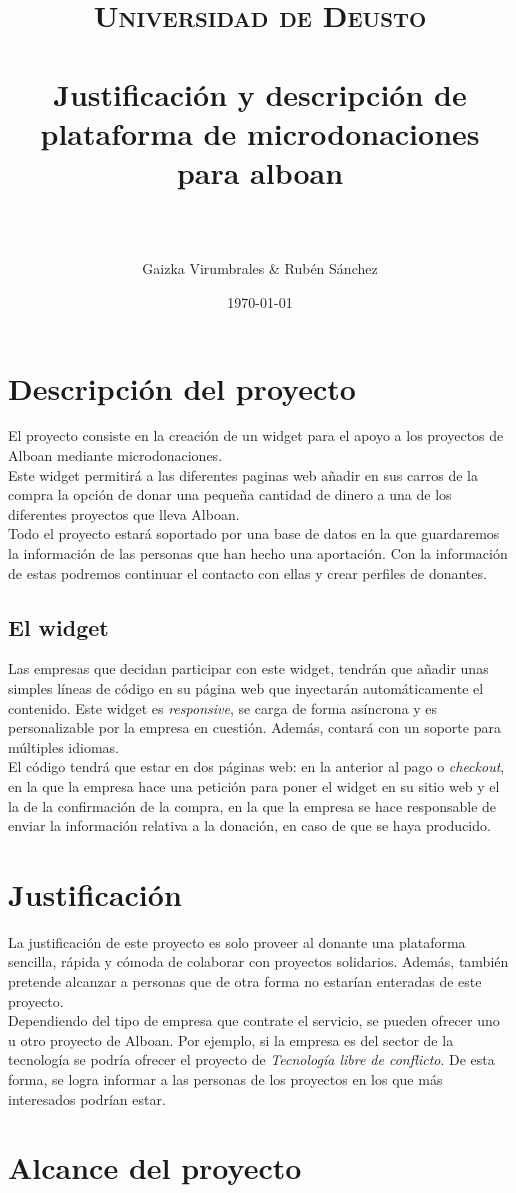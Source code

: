 \documentclass[paper=a4, fontsize=12pt]{scrartcl} %
\title{	
\normalfont \normalsize 
\textsc{Universidad de Deusto} \\ [25pt] %
\horrule{0.5pt} \\[0.4cm] %
\huge Justificación y descripción de plataforma de microdonaciones para alboan\\ %
\horrule{2pt} \\[0.5cm] %
\author{Gaizka Virumbrales \& Rubén Sánchez} %
}
\date{\normalsize\today} %
\numberwithin{equation}{section} %
\numberwithin{figure}{section} %
\numberwithin{table}{section} %
\begin{document}
\maketitle %


\section{Descripción del proyecto}

El proyecto consiste en la creación de un widget para el apoyo a los proyectos de Alboan mediante microdonaciones.\\
Este widget permitirá a las diferentes paginas web añadir en sus carros de la compra la opción de donar una pequeña cantidad de dinero a una de los diferentes proyectos que lleva Alboan.\\
Todo el proyecto estará soportado por una base de datos en la que guardaremos la información de las personas que han hecho una aportación. Con la información de estas podremos continuar el contacto con ellas y crear perfiles de donantes.


\subsection{El widget}
Las empresas que decidan participar con este widget, tendrán que añadir unas simples líneas de código en su página web que inyectarán automáticamente el contenido. Este widget es \textit{responsive}, se carga de forma asíncrona y es personalizable por la empresa en cuestión. Además, contará con un soporte para múltiples idiomas.\\
El código tendrá que estar en dos páginas web: en la anterior al pago o \textit{checkout}, en la que la empresa hace una petición para poner el widget en su sitio web y el la de la confirmación de la compra, en la que la empresa se hace responsable de enviar la información relativa a la donación, en caso de que se haya producido.

\section{Justificación}
La justificación de este proyecto es solo proveer al donante una plataforma sencilla, rápida y cómoda de colaborar con proyectos solidarios. Además, también pretende alcanzar a personas que de otra forma no estarían enteradas de este proyecto. \\
Dependiendo del tipo de empresa que contrate el servicio, se pueden ofrecer uno u otro proyecto de Alboan. Por ejemplo, si la empresa es del sector de la tecnología se podría ofrecer el proyecto de \textit{Tecnología libre de conflicto}. De esta forma, se logra informar a las personas de los proyectos en los que más interesados podrían estar.

\section{Alcance del proyecto}
\end{document}

